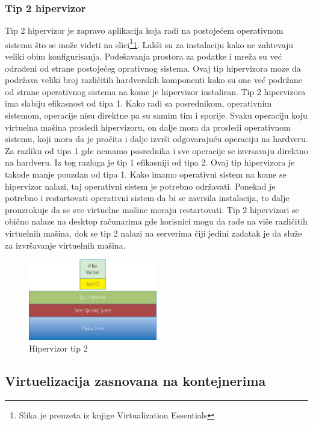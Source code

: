 \documentclass[12pt,oneside]{memoir}
\begin{document}
\subsubsection{Tip 2 hipervizor}
Tip 2 hipervizor je zapravo aplikacija koja radi na postojećem operativnom sistemu što se može videti na slici\footnote{Slika je preuzeta iz knjige Virtualization Essentials}\ref{fig:hipervizorTip2}. Lakši su za instalaciju kako ne zahtevaju veliki obim konfigurisanja. Podešavanja prostora za podatke i mreža su već odrađeni od strane postojećeg oprativnog sistema. Ovaj tip hipervizora moze da podržava veliki broj različitih hardverskih komponenti kako su one već podržane od strane operativnog sistema na kome je hipervizor instaliran. Tip 2 hipervizora ima slabiju efikasnost od tipa 1\cite{ve}. Kako radi sa posrednikom, operativnim sistemom, operacije nisu direktne pa su samim tim i sporije. Svaku operaciju koju virtuelna mašina prosledi hipervizoru, on dalje mora da prosledi operativnom sistemu, koji mora da je pročita i dalje izvrši odgovarajuću operaciju na hardveru. Za razliku od tipa 1 gde nemamo posrednika i sve operacije se izvrsavaju direktno na hardveru. Iz tog razloga je tip 1 efikasniji od tipa 2. 
Ovaj tip hipervizora je takođe manje pouzdan od tipa 1. Kako imamo operativni sistem na kome se hipervizor nalazi, taj operativni sistem je potrebno održavati. Ponekad je potrebno i restartovati operativni sistem da bi se zavrsila instalacija, to dalje prouzrokuje da se sve virtuelne mašine moraju restartovati. Tip 2 hipervizori se obično nalaze na desktop računarima gde korisnici mogu da rade na više različitih virtuelnih mašina, dok se tip 2 nalazi na serverima čiji jedini zadatak je da služe za izvršavanje virtuelnih mašina.

\begin{figure}[!ht]
  \centering
  \includegraphics[width=0.5\textwidth]{Slika 3.jpg}
  \caption{Hipervizor tip 2}
  \label{fig:hipervizorTip2}
\end{figure}

 
\subsection{Virtuelizacija zasnovana na kontejnerima}
\end{document}
